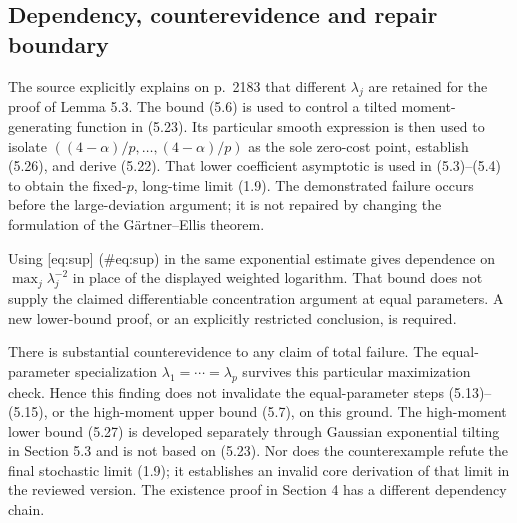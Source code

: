 \documentclass[10pt]{article}
\begin{document}
\subsection*{Dependency, counterevidence and repair boundary}
The source explicitly explains on p. 2183 that different \(\lambda_j\) are retained for the proof of Lemma 5.3. The bound (5.6) is used to control a tilted moment-generating function in (5.23). Its particular smooth expression is then used to isolate \(((4-\alpha)/p,\ldots,(4-\alpha)/p)\) as the sole zero-cost point, establish (5.26), and derive (5.22). That lower coefficient asymptotic is used in (5.3)–(5.4) to obtain the fixed-\(p\), long-time limit (1.9). The demonstrated failure occurs before the large-deviation argument; it is not repaired by changing the formulation of the Gärtner–Ellis theorem.\par
Using [eq:sup] (\#eq:sup) in the same exponential estimate gives dependence on \(\max_j\lambda_j^{-2}\) in place of the displayed weighted logarithm. That bound does not supply the claimed differentiable concentration argument at equal parameters. A new lower-bound proof, or an explicitly restricted conclusion, is required.\par
There is substantial counterevidence to any claim of total failure. The equal-parameter specialization \(\lambda_1=\cdots=\lambda_p\) survives this particular maximization check. Hence this finding does not invalidate the equal-parameter steps (5.13)–(5.15), or the high-moment upper bound (5.7), on this ground. The high-moment lower bound (5.27) is developed separately through Gaussian exponential tilting in Section 5.3 and is not based on (5.23). Nor does the counterexample refute the final stochastic limit (1.9); it establishes an invalid core derivation of that limit in the reviewed version. The existence proof in Section 4 has a different dependency chain.\par
\end{document}
